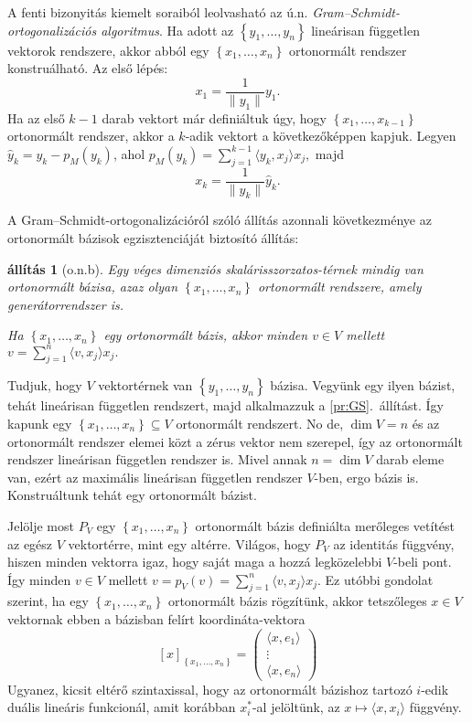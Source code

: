 \documentclass[9pt, a4paper, showtrims]{memoir}
\makeatletter
\renewenvironment{proof}[1][\proofname]
    {\par\pushQED{\qed}%
    \normalfont \topsep6\p@\@plus6\p@\relax
    \trivlist
    \item[\hskip\labelsep
        \itshape
    #1\@addpunct{:}]\ignorespaces}
    {\popQED\endtrivlist\@endpefalse}
\theoremstyle{plain}
\newtheorem{proposition}{állítás}[chapter]
\theoremstyle{remark}
\theoremstyle{definition}
\newcommand{\ip}[2]{\langle#1,#2\rangle}
\makeatother
\begin{document}
A fenti bizonyitás kiemelt soraiból leolvasható az ú.n. \emph{Gram--Schmidt-ortogonalizációs algoritmus}.
Ha adott az $\left\{ y_1,\dots,y_n \right\}$ lineárisan független vektorok rendszere, akkor abból egy 
$\left\{ x_1,\dots,x_n \right\}$ ortonormált rendszer konstruálható.
Az első lépés:
\[
    x_1=\frac{1}{\|y_1\|}y_1.
\]
Ha az első $k-1$ darab vektort már definiáltuk úgy, hogy $\left\{ x_1,\dots,x_{k-1} \right\}$ ortonormált rendszer,
akkor a $k$-adik vektort a következőképpen kapjuk.
Legyen $\hat{y}_k=y_k-p_M\left( y_k \right)$, 
ahol 
$p_M\left( y_k \right)=\sum_{j=1}^{k-1}\ip{y_k}{x_j}x_j,$
majd 
\[
    x_k=\frac{1}{\|\hat{y}_k\|}\hat{y}_k.
\]

A Gram--Schmidt-ortogonalizációról szóló állítás azonnali következménye az ortonormált bázisok egzisztenciáját biztosító állítás:
\begin{proposition}[o.n.b]\label{pr:onb}
    Egy véges dimenziós skalárisszorzatos-térnek mindig van ortonormált bázisa, azaz olyan $\left\{ x_1,\dots,x_n \right\}$ ortonormált
    rendszere, amely generátorrendszer is.

    Ha $\left\{ x_1,\dots,x_n \right\}$ egy ortonormált bázis, akkor minden $v\in V$ mellett
    \(
        v=
        \sum_{j=1}^n\ip{v}{x_j}x_j.
    \)
\end{proposition}
\begin{proof}
    Tudjuk, hogy $V$ vektortérnek van $\left\{ y_1,\dots,y_n \right\}$ bázisa.
    Vegyünk egy ilyen bázist, tehát lineárisan független rendszert, majd alkalmazzuk a \ref{pr:GS}.~állítást.
    Így kapunk egy 
    \begin{math}
        \left\{ x_1,\dots,x_n \right\}\subseteq V
    \end{math}
    ortonormált rendszert.
    No de, $\dim V=n$ és az ortonormált rendszer elemei közt a zérus vektor nem szerepel,
    így az ortonormált rendszer lineárisan független rendszer is. 
    Mivel annak $n=\dim V$ darab eleme van, 
    ezért az maximális lineárisan független rendszer $V$-ben, ergo bázis is.
    Konstruáltunk tehát egy ortonormált bázist.

    Jelölje most $P_V$ egy $\left\{ x_1,\dots,x_n \right\}$
    ortonormált bázis definiálta merőleges vetítést az egész $V$ vektortérre, mint egy altérre.
    Világos, hogy $P_V$ az identitás függvény, 
    hiszen minden vektorra igaz, hogy saját maga a hozzá legközelebbi $V$-beli pont.
    Így minden $v\in V$ mellett $v=p_V\left( v \right)=\sum_{j=1}^n\ip{v}{x_j}x_j.$
\end{proof}
Ez utóbbi gondolat szerint,
ha egy $\left\{ x_1,\dots,x_n \right\}$ ortonormált bázis rögzítünk,
akkor tetszőleges $x\in V$ vektornak ebben a bázisban felírt koordináta-vektora
\[
    [x]_{\left\{x_1,\dots,x_n\right\}}
    =
    \begin{pmatrix}
        \ip{x}{e_1}\\ \vdots \\\ip{x}{e_n}
    \end{pmatrix}
\]
Ugyanez, kicsit eltérő szintaxissal, hogy az ortonormált bázishoz tartozó
$i$-edik duális lineáris funkcionál, 
amit korábban $x_i^\ast$-al jelöltünk, az $x\mapsto\ip{x}{x_i}$
függvény.
\end{document}
